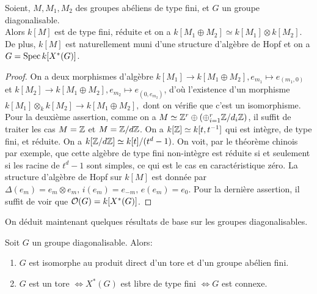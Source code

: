 \begin{prop}
Soient, $M, M_1, M_2$ des groupes abéliens de type fini, et $G$ un groupe diagonalisable.\\
Alors $k[M]$ est de type fini, réduite et on a $k[M_1\oplus M_2]\simeq k[M_1]\otimes k[M_2]$. De plus, $k[M]$ est naturellement muni d'une structure d'algèbre de Hopf et on a $G=\operatorname{Spec} k[X^*(G)]$.
\end{prop}
\begin{proof}
On a deux morphismes d'algèbre $k[M_1]\rightarrow k[M_1\oplus M_2], e_{m_1}\mapsto e_{(m_1,0)}$ et $k[M_2]\rightarrow k[M_1\oplus M_2], e_{m_2}\mapsto e_{(0,e_{m_2})}$, d'où l'existence d'un morphisme $k[M_1]\otimes_k k[M_2]\rightarrow k[M_1\oplus M_2], $ dont on vérifie que c'est un isomorphisme.
Pour la deuxième assertion, comme on a $M\simeq \mathbb{Z}^r\oplus (\oplus_{i=1}^r \mathbb{Z}/d_i\mathbb{Z})$, il suffit de traiter les cas $M=\mathbb{Z}$ et $M=\mathbb{Z}/d\mathbb{Z}$. On a $k[\mathbb{Z}]\simeq k[t,t^{-1}]$ qui est intègre, de type fini, et réduite. On a $k[\mathbb{Z}/d\mathbb{Z}]\simeq k[t]/(t^d-1)$. On voit, par le théorème chinois par exemple, que cette algèbre de type fini non-intègre est réduite si et seulement si les racine de $t^d-1$ sont simples, ce qui est le cas en caractéristique zéro. La structure d'algèbre de Hopf sur $k[M]$ est donnée par $\Delta(e_m)=e_m\otimes e_m,\, i(e_m)=e_{-m},\, e(e_m)=e_0$. Pour la dernière assertion, il suffit de voir que $\mathcal{O}(G)=k[X^*(G)]$.
\end{proof}

\noindent On déduit maintenant quelques résultats de base sur les groupes diagonalisables.

\begin{prop}
Soit $G$ un groupe diagonalisable. Alors:
\begin{enumerate}
\item $G$ est isomorphe au produit direct d'un tore et d'un groupe abélien fini.
\item $G$ est un tore $\iff X^*(G)$ est libre de type fini $\iff G$ est connexe.
\end{enumerate}
\end{prop}


